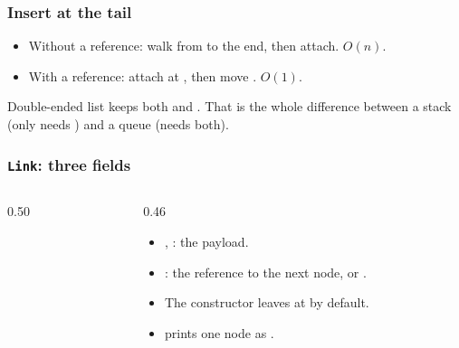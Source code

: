 \documentclass[aspectratio=169,10pt,compress]{beamer}
\begin{document}
\begin{frame}[t,fragile] \frametitle{Insert at the tail}
  \begin{itemize}\small
    \item Without a  reference: walk from  to
          the end, then attach. $O(n)$.
    \item With a  reference: attach at ,
          then move . $O(1)$.
  \end{itemize}
  \vspace{0.4em}
  \begin{block}{Double-ended list}
    \small
     keeps both  and .
    That is the whole difference between a stack (only needs
    ) and a queue (needs both).
  \end{block}
\end{frame}



\begin{frame}[t,fragile] \frametitle{\texttt{Link}: three fields}
  \begin{columns}[T]
    \begin{column}{0.50\textwidth}
    \end{column}
    \begin{column}{0.46\textwidth}
      \begin{itemize}\small
        \item {}, : the payload.
        \item {}: the reference to the next node, or .
        \item The constructor leaves  at  by default.
        \item {} prints one node as .
      \end{itemize}
    \end{column}
  \end{columns}
\end{frame}

\end{document}

